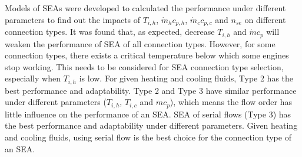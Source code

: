 Models of SEAs were developed to calculated the performance under different parameters to find out the impacts of $T_{i,h}$, $\dot{m}_hc_{p,h}$, $\dot{m}_cc_{p,c}$ and $n_{se}$ on different connection types. It was found that, as expected, decrease $T_{i,h}$ and $\dot{m}c_{p}$ will weaken the performance of SEA of all connection types. However, for some connection types, there exists a critical temperature below which some engines stop working. This needs to be considered for SEA connection type selection, especially when $T_{i,h}$ is low. For given heating and cooling fluids, Type 2 has the best performance and adaptability. Type 2 and Type 3 have similar performance under different parameters ($T_{i,h}$, $T_{i,c}$ and $\dot{m}c_p$), which means the flow order has little influence on the performance of an SEA. SEA of serial flows (Type 3) has the best performance and adaptability under different parameters. Given heating and cooling fluids, using serial flow is the best choice for the connection type of an SEA. %

